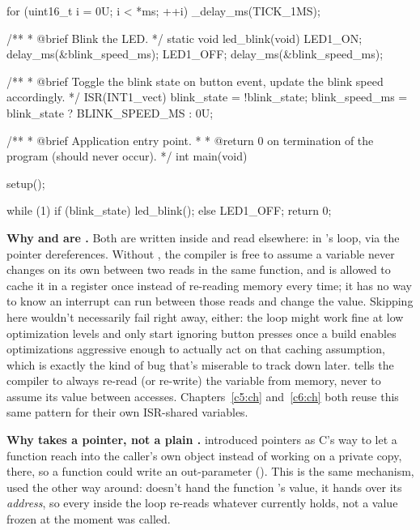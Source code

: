 \begin{ccode}
{    for (uint16_t i = 0U; i < *ms; ++i)
    {
        _delay_ms(TICK_1MS);
    }
}

/**
 * @brief Blink the LED.
 */
static void led_blink(void)
{
    LED1_ON;
    delay_ms(&blink_speed_ms);
    LED1_OFF;
    delay_ms(&blink_speed_ms);
}

/**
 * @brief Toggle the blink state on button event, update the blink speed accordingly.
 */
ISR(INT1_vect)
{
    blink_state    = !blink_state;
    blink_speed_ms = blink_state ? BLINK_SPEED_MS : 0U;
}

/**
 * @brief Application entry point.
 *
 * @return 0 on termination of the program (should never occur).
 */
int main(void)
{
    setup();

    while (1)
    {
        if (blink_state) { led_blink(); }
        else { LED1_OFF; }
    }
    return 0;
}
\end{ccode}

\textbf{Why  and  are .} Both are written
inside  and read elsewhere:  in 's loop,
 via the pointer  dereferences. Without , the
compiler is free to assume a variable never changes on its own between two reads in the same
function, and is allowed to cache it in a register once instead of re-reading memory every time; it
has no way to know an interrupt can run between those reads and change the value. Skipping
 here wouldn't necessarily fail right away, either: the loop might work fine at low
optimization levels and only start ignoring button presses once a build enables optimizations
aggressive enough to actually act on that caching assumption, which is exactly the kind of bug
that's miserable to track down later.  tells the compiler to always re-read (or
re-write) the variable from memory, never to assume its value between accesses.
Chapters~\ref{c5:ch} and~\ref{c6:ch} both reuse this same pattern for their own ISR-shared
variables.

\textbf{Why  takes a pointer, not a plain .} 
introduced pointers as C's way to let a function reach into the caller's own object instead of
working on a private copy, there, so a function could write an out-parameter (). This
is the same mechanism, used the other way around:  doesn't hand the
function 's value, it hands over its \emph{address}, so every  inside
the loop re-reads whatever  currently holds, not a value frozen at the moment
 was called.

